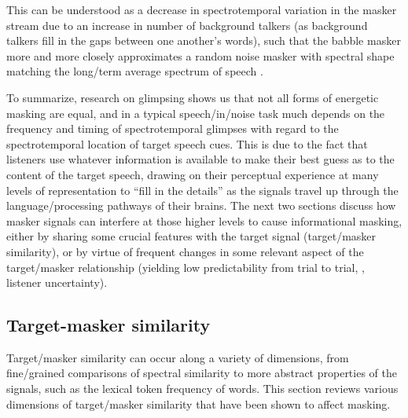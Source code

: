 This can be understood as a decrease in spectrotemporal variation in the masker stream due to an increase in number of background talkers (as background talkers fill in the gaps between one another’s words), such that the babble masker more and more closely approximates a random noise masker with spectral shape matching the long\-/term average spectrum of speech \citep{SimpsonCooke2005}. %

To summarize, research on glimpsing shows us that not all forms of energetic masking are equal, and in a typical speech\-/in\-/noise task much depends on the frequency and timing of spectrotemporal glimpses with regard to the spectrotemporal location of target speech cues.  This is due to the fact that listeners use whatever information is available to make their best guess as to the content of the target speech, drawing on their perceptual experience at many levels of representation to “fill in the details” as the signals travel up through the language\-/processing pathways of their brains.  The next two sections discuss how masker signals can interfere at those higher levels to cause informational masking, either by sharing some crucial features with the target signal (target\-/masker similarity), or by virtue of frequent changes in some relevant aspect of the target\-/masker relationship (yielding low predictability from trial to trial, \ie, listener uncertainty).

\subsection{Target-masker similarity\label{sec:Similarity}}
Target\-/masker similarity can occur along a variety of dimensions, from fine\-/grained comparisons of spectral similarity to more abstract properties of the signals, such as the lexical token frequency of words.  This section reviews various dimensions of target\-/masker similarity that have been shown to affect masking.

